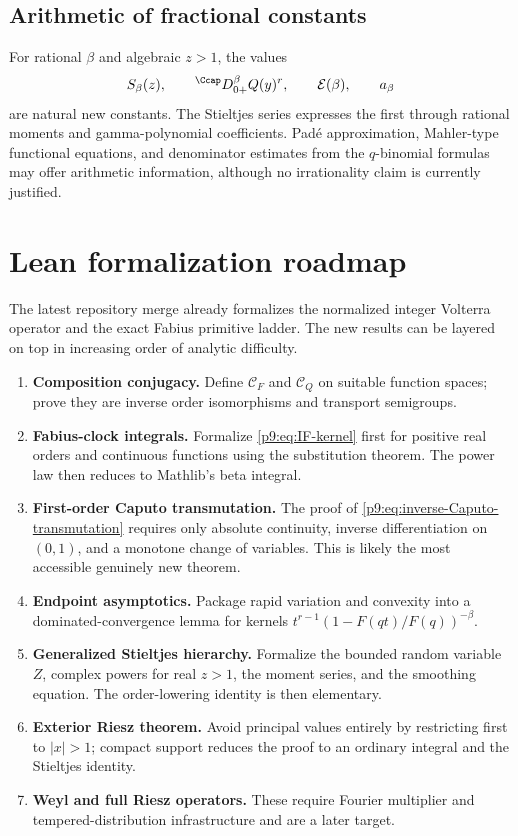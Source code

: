 \documentclass[11pt,oneside]{article}
\theoremstyle{definition}
\theoremstyle{remark}
\newcommand{\1}{\mathbf 1}
\begin{document}
\subsection{Arithmetic of fractional constants}

For rational $\beta$ and algebraic $z>1$, the values
\begin{equation}
 S_\beta(z),
 \qquad
 {}^{\Ccap}D_{0+}^\beta Q(y)^r,
 \qquad
 \mathcal E(\beta),
 \qquad
 a_\beta
 \label{p9:eq:fractional-constants}
\end{equation}
are natural new constants.  The Stieltjes series expresses the first through
rational moments and gamma-polynomial coefficients.  Pad\'e approximation,
Mahler-type functional equations, and denominator estimates from the
$q$-binomial formulas may offer arithmetic information, although no
irrationality claim is currently justified.

\section{Lean formalization roadmap}
\label{p9:sec:Lean}

The latest repository merge already formalizes the normalized integer
Volterra operator and the exact Fabius primitive ladder.  The new results can
be layered on top in increasing order of analytic difficulty.

\begin{enumerate}
\item \textbf{Composition conjugacy.}  Define $\mathcal C_F$ and
      $\mathcal C_Q$ on suitable function spaces; prove they are inverse
      order isomorphisms and transport semigroups.
\item \textbf{Fabius-clock integrals.}  Formalize
      \cref{p9:eq:IF-kernel} first for positive real orders and continuous
      functions using the substitution theorem.  The power law then reduces
      to Mathlib's beta integral.
\item \textbf{First-order Caputo transmutation.}  The proof of
      \cref{p9:eq:inverse-Caputo-transmutation} requires only absolute
      continuity, inverse differentiation on $(0,1)$, and a monotone change of
      variables.  This is likely the most accessible genuinely new theorem.
\item \textbf{Endpoint asymptotics.}  Package rapid variation and convexity
      into a dominated-convergence lemma for kernels
      $t^{r-1}(1-F(qt)/F(q))^{-\beta}$.
\item \textbf{Generalized Stieltjes hierarchy.}  Formalize the bounded random
      variable $Z$, complex powers for real $z>1$, the moment series, and the
      smoothing equation.  The order-lowering identity is then elementary.
\item \textbf{Exterior Riesz theorem.}  Avoid principal values entirely by
      restricting first to $|x|>1$; compact support reduces the proof to an
      ordinary integral and the Stieltjes identity.
\item \textbf{Weyl and full Riesz operators.}  These require Fourier
      multiplier and tempered-distribution infrastructure and are a later
      target.
\end{enumerate}
\end{document}
